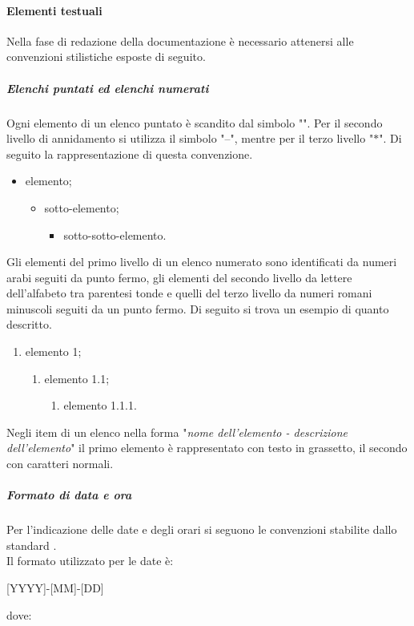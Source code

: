 \paragraph{Elementi testuali}
Nella fase di redazione della documentazione è necessario attenersi alle convenzioni stilistiche esposte di seguito.
\subparagraph{Elenchi puntati ed elenchi numerati}
Ogni elemento di un elenco puntato è scandito dal simbolo "\textbullet". Per il secondo livello di annidamento si utilizza il simbolo "--", mentre per il terzo livello "$\ast$". Di seguito la rappresentazione di questa convenzione.
\begin{itemize}
    \item elemento;
    \begin{itemize}
        \item sotto-elemento;
        \begin{itemize}
            \item sotto-sotto-elemento.
        \end{itemize}
    \end{itemize}
\end{itemize}
Gli elementi del primo livello di un elenco numerato sono identificati da numeri arabi seguiti da punto fermo, gli elementi del secondo livello da lettere dell'alfabeto tra parentesi tonde e quelli del terzo livello da numeri romani minuscoli seguiti da  un punto fermo. Di seguito si trova un esempio di quanto descritto.
\begin{enumerate}
    \item elemento 1;
    \begin{enumerate}
        \item elemento 1.1;
        \begin{enumerate}
            \item elemento 1.1.1.
        \end{enumerate}
    \end{enumerate}
\end{enumerate}
Negli item di un elenco nella forma "\textit{nome dell'elemento - descrizione dell'elemento}"  il primo elemento è rappresentato con testo in grassetto, il secondo con caratteri normali.
\subparagraph{Formato di data e ora}
Per l'indicazione delle date e degli orari si seguono le convenzioni stabilite dallo standard . \\
Il formato utilizzato per le date è:
\begin{center}
    [YYYY]-[MM]-[DD]
\end{center}
    dove:
